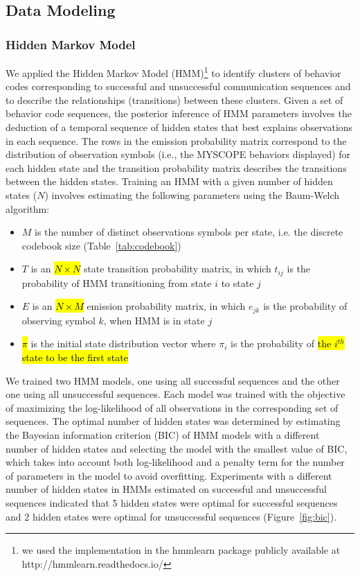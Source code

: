 \documentclass[smallextended]{svjour3}       %
\begin{document}
\subsection{Data Modeling}
\label{subsec:dataModeling}
\subsubsection{Hidden Markov Model}
\label{subsubsec:hiddenMarkovModel}
We applied the Hidden Markov Model (HMM)\footnote{we used the implementation in the hmmlearn package publicly available at http://hmmlearn.readthedocs.io/} to identify clusters of behavior codes corresponding to successful and unsuccessful communication sequences and to describe the relationships (transitions) between these clusters. Given a set of behavior code sequences, the posterior inference of HMM parameters involves the deduction of a temporal sequence of hidden states that best explains observations in each sequence. The rows in the emission probability matrix correspond to the distribution of observation symbols (i.e., the MYSCOPE behaviors displayed) for each hidden state and the transition probability matrix describes the transitions between the hidden states. Training an HMM with a given number of hidden states ($N$) involves estimating the following parameters using the Baum-Welch algorithm:

\begin{itemize}
\item $M$ is the number of distinct observations symbols per state, i.e. the discrete codebook size (Table~\ref{tab:codebook})
\item $T$ is an \hl{$N \times N$} state transition probability matrix, in which $t_{ij}$ is the probability of HMM transitioning from state $i$ to state $j$  
\item $E$ is an \hl{$N \times M$} emission probability matrix, in which $e_{jk}$ is the probability of observing symbol $k$, when HMM is in state $j$ 
\item \hl{$\pi$} is the initial state distribution vector where $\pi_i$ is the probability of \hl{the $i^{th}$ state to be the first state}
\end{itemize}

We trained two HMM models, one using all successful sequences and the other one using all unsuccessful sequences. Each model was trained with the objective of maximizing the log-likelihood of all observations in the corresponding set of sequences. The optimal number of hidden states was determined by estimating the Bayesian information criterion (BIC) of HMM models with a different number of hidden states and selecting the model with the smallest value of BIC, which takes into account both log-likelihood and a penalty term for the number of parameters in the model to avoid overfitting. Experiments with a different number of hidden states in HMMs estimated on successful and unsuccessful sequences indicated that 5 hidden states were optimal for successful sequences and 2 hidden states were optimal for unsuccessful sequences (Figure~\ref{fig:bic}). 
\end{document}
